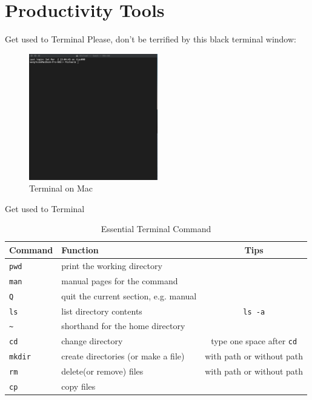 \documentclass[handout]{beamer} %
\begin{document}
\section{Productivity Tools}


\begin{frame}{Get used to Terminal}
	Please, don't be terrified by this black terminal window:
	\begin{figure}[H]
		\centering
		\includegraphics[width = 0.5\textwidth]{Pictures/terminal}
		\caption{Terminal on Mac}
	\end{figure}
\end{frame}

\begin{frame}{Get used to Terminal}
\footnotesize
\begin{table}[H]
	\centering
	\begin{tabular}{llc}
	\hline 
	\hline 
		Command & Function & Tips \\
		\hline 
		\texttt{pwd} & print the working directory & \\
		\texttt{man} & manual pages for the command & \\
		\texttt{Q} & quit the current section, e.g. manual & \\
		\texttt{ls} & list directory contents & \texttt{ls -a} \\
		\texttt{\~} & shorthand for the home directory & \\
		\texttt{cd} & change directory & type one space after \texttt{cd} \\
		\texttt{mkdir} & create directories (or make a file) & with path or without path \\
		\texttt{rm} & delete(or remove) files & with path or without path \\
		\texttt{cp} & copy files & \\
		\hline
	\end{tabular}
	\caption{Essential Terminal Command}
\end{table}	

\end{frame}
\end{document}
